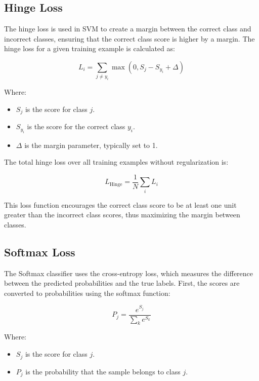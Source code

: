 \documentclass{article}
\begin{document}
\subsection{Hinge Loss}
The hinge loss is used in SVM to create a margin between the correct class and incorrect classes, ensuring that the correct class score is higher by a margin. The hinge loss for a given training example is calculated as:

\begin{equation}
    L_i = \sum_{j \neq y_i} \max(0, S_j - S_{y_i} + \Delta)
\end{equation}

Where:
\begin{itemize}
    \item \( S_j \) is the score for class \( j \).
    \item \( S_{y_i} \) is the score for the correct class \( y_i \).
    \item \( \Delta \) is the margin parameter, typically set to 1.
\end{itemize}

The total hinge loss over all training examples without regularization is:

\begin{equation}
    L_{\text{Hinge}} = \frac{1}{N} \sum_{i} L_i
\end{equation}

This loss function encourages the correct class score to be at least one unit greater than the incorrect class scores, thus maximizing the margin between classes.

\subsection{Softmax Loss}
The Softmax classifier uses the cross-entropy loss, which measures the difference between the predicted probabilities and the true labels. First, the scores are converted to probabilities using the softmax function:

\begin{equation}
    P_j = \frac{e^{S_j}}{\sum_k e^{S_k}}
\end{equation}

Where:
\begin{itemize}
    \item \( S_j \) is the score for class \( j \).
    \item \( P_j \) is the probability that the sample belongs to class \( j \).
\end{itemize}
\end{document}
